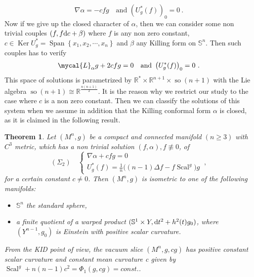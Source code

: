 \documentclass[a4paper,11pt,leqno]{amsart}
\numberwithin{equation}{section}
\theoremstyle{main}
\newtheorem{thm} {\bf  Theorem} [section]
\begin{document}
$$\nabla\alpha=-cfg \quad \textrm{and } \left(U^*_g(f)\right)_0=0 \ .$$
Now if we give up the closed character of $\alpha$, then we can consider some non trivial couples  $(f,f{{\rm d}} c + \beta)$ where $f$ is any non zero constant, $c\in {\operatorname{Ker}} U^*_g={\operatorname{Span}}\left\{x_1,x_2,\cdots, x_n\right\}$ and $\beta$ any Killing form  on ${{\mathbb S^{n}}}$. Then such couples has to verify 
$$\mycal{L}_\alpha g + 2cfg= 0 \quad \textrm{and } \left(U^*_g(f)\right)_0=0 \ .$$
This space of solutions is parametrized by ${{\mathbb R}}^*\times {{\mathbb R}}^{n+1}\times {\operatorname{so}}(n+1)$ with the Lie algebra ${\operatorname{so}}(n+1)\cong {{\mathbb R}}^{\frac{n(n+1)}{2}}$. It is the reason why we restrict our study to the case where $c$ is a non zero constant. Then we can classify the solutions of this system when we assume in addition that the Killing conformal form $\alpha$ is closed, as it is claimed in the following result.

\begin{thm}\label{KID2}
Let $(M^n, g)$ be a compact and connected manifold $(n\ge3)$ with $C^3$ metric, which has a non trivial solution $(f,\alpha), f\not\equiv 0$, of
$$(\Sigma_2)\quad \left\{
\begin{array}{l}
	 \nabla\alpha+ cfg= 0 \\
	 U_g^* (f)=\frac{1}{n}\Big((n-1) \Delta f -f {\operatorname{Scal}}^g\Big) g
\end{array}\right. \ ,$$
for a certain constant $c \neq 0$. Then $(M^n, g)$ is isometric to one of the following manifolds:
\begin{itemize}
	\item[(i)] ${{\mathbb S^{n}}}$ the standard sphere,
	\item[(ii)] a finite quotient  of a warped product $(\mathbb S^1 \times Y, {{\rm d}} t^2 + h^2 (t)g_0)$, where $(Y^{n-1},g_0)$ is Einstein with positive scalar curvature.
\end{itemize}
From the KID point of view, the vacuum slice $(M^n, g, cg)$ has positive constant scalar curvature and constant mean curvature c given by ${\operatorname{Scal}}^g +n(n-1)c^2= \Phi_1(g,cg)=const.$.
\end{thm}
\end{document}
